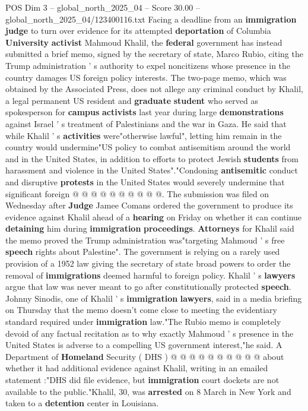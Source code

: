 \begin{textsample}{POS Dim 3 – global\_north\_2025\_04 – Score 30.00 – global\_north\_2025\_04/123400116.txt}  \label{ex:f3_pos_044}
Facing a deadline from an \textbf{immigration} \textbf{judge} to turn over evidence for its attempted \textbf{deportation} of Columbia \textbf{University} \textbf{activist} Mahmoud Khalil, the \textbf{federal} government has instead submitted a brief memo, signed by the secretary of state, Marco Rubio, citing the Trump administration ' s authority to expel noncitizens whose presence in the country damages US foreign policy interests.
The two-page memo, which was obtained by the Associated Press, does not allege any criminal conduct by Khalil, a legal permanent US resident and \textbf{graduate} \textbf{student} who served as spokesperson for \textbf{campus} \textbf{activists} last year during large \textbf{demonstrations} against Israel ' s treatment of Palestinians and the war in Gaza.
He said that while Khalil ' s \textbf{activities} were"otherwise lawful", letting him remain in the country would undermine"US policy to combat antisemitism around the world and in the United States, in addition to efforts to protect Jewish \textbf{students} from harassment and violence in the United States"."Condoning \textbf{antisemitic} conduct and disruptive \textbf{protests} in the United States would severely undermine that significant foreign @ @ @ @ @ @ @ @ @ @.
The submission was filed on Wednesday after \textbf{Judge} Jamee Comans ordered the government to produce its evidence against Khalil ahead of a \textbf{hearing} on Friday on whether it can continue \textbf{detaining} him during \textbf{immigration} \textbf{proceedings}. \textbf{Attorneys} for Khalil said the memo proved the Trump administration was"targeting Mahmoud ' s free \textbf{speech} rights about Palestine".
The government is relying on a rarely used provision of a 1952 law giving the secretary of state broad powers to order the removal of \textbf{immigrations} deemed harmful to foreign policy.
Khalil ' s \textbf{lawyers} argue that law was never meant to go after constitutionally protected \textbf{speech}.
Johnny Sinodis, one of Khalil ' s \textbf{immigration} \textbf{lawyers}, said in a media briefing on Thursday that the memo doesn't come close to meeting the evidentiary standard required under \textbf{immigration} law."The Rubio memo is completely devoid of any factual recitation as to why exactly Mahmoud ' s presence in the United States is adverse to a compelling US government interest,"he said.
A Department of \textbf{Homeland} Security ( DHS ) @ @ @ @ @ @ @ @ @ @ about whether it had additional evidence against Khalil, writing in an emailed statement :"DHS did file evidence, but \textbf{immigration} court dockets are not available to the public."Khalil, 30, was \textbf{arrested} on 8 March in New York and taken to a \textbf{detention} center in Louisiana.

\end{textsample}
